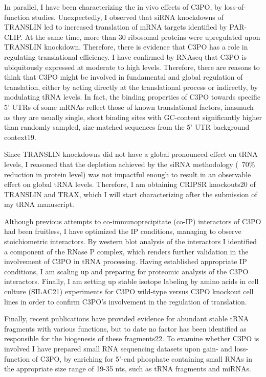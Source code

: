 \documentclass[12pt]{rockefeller}
\begin{document}
In parallel, I have been characterizing the in vivo effects of C3PO, by loss-of-function studies. Unexpectedly, I observed that siRNA knockdowns of TRANSLIN led to increased translation of mRNA targets identified by PAR-CLIP. At the same time, more than 30 ribosomal proteins were upregulated upon TRANSLIN knockdown. Therefore, there is evidence that C3PO has a role in regulating translational efficiency. I have confirmed by RNAseq that C3PO is ubiquitously expressed at moderate to high levels. Therefore, there are reasons to think that C3PO might be involved in fundamental and global regulation of translation, either by acting directly at the translational process or indirectly, by modulating tRNA levels. In fact, the binding properties of C3PO towards specific 5’ UTRs of some mRNAs reflect those of known translational factors, inasmuch as they are usually single, short binding sites with GC-content significantly higher than randomly sampled, size-matched sequences from the 5’ UTR background context19.

Since TRANSLIN knockdowns did not have a global pronounced effect on tRNA levels, I reasoned that the depletion achieved by the siRNA methodology (~70\% reduction in protein level) was not impactful enough to result in an observable effect on global tRNA levels. Therefore, I am obtaining CRIPSR knockouts20 of TRANSLIN and TRAX, which I will start characterizing after the submission of my tRNA manuscript.

Although previous attempts to co-immunoprecipitate (co-IP) interactors of C3PO had been fruitless, I have optimized the IP conditions, managing to observe stoichiometric interactors. By western blot analysis of the interactors I identified a component of the RNase P complex, which renders further validation in the involvement of C3PO in tRNA processing. Having established appropriate IP conditions, I am scaling up and preparing for proteomic analysis of the C3PO interactors. Finally, I am setting up stable isotope labeling by amino acids in cell culture (SILAC21) experiments for C3PO wild-type versus C3PO knockout cell lines in order to confirm C3PO’s involvement in the regulation of translation.	

Finally, recent publications have provided evidence for abundant stable tRNA fragments with various functions, but to date no factor has been identified as responsible for the biogenesis of these fragments22. To examine whether C3PO is involved I have prepared small RNA sequencing datasets upon gain- and loss-function of C3PO, by enriching for 5’-end phosphate containing small RNAs in the appropriate size range of 19-35 nts, such as tRNA fragments and miRNAs. 
\end{document}
